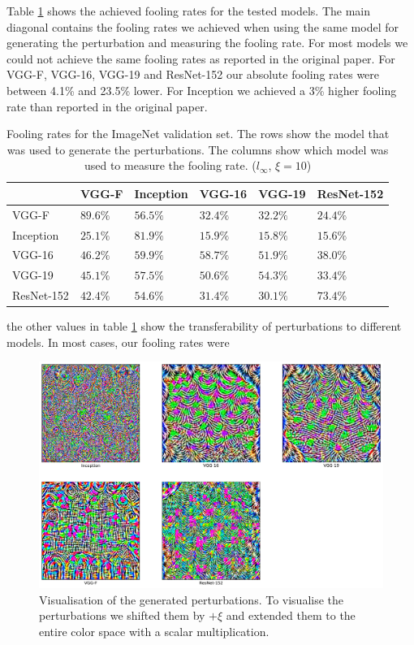 \documentclass[runningheads]{llncs}
\begin{document}
Table \ref{tbl_stoerraten_reprod_kreuz_linf} shows the achieved fooling rates for the tested models. The main diagonal contains the fooling rates we achieved when using the same model for generating the perturbation and measuring the fooling rate. For most models we could not achieve the same fooling rates as reported in the original paper. For VGG-F, VGG-16, VGG-19 and ResNet-152 our absolute fooling rates were between 4.1\% and 23.5\% lower. For Inception we achieved a 3\% higher fooling rate than reported in the original paper.

\begin{table}[]
\centering
\caption{Fooling rates for the ImageNet validation set. The rows show the model that was used to generate the perturbations. The columns show which model was used to measure the fooling rate. ($l_\infty$, $\xi=10$)}
\begin{tabular}{|l|l|l|l|l|l|}
\hline

			& VGG-F		&	Inception	&	VGG-16		&	VGG-19		&	ResNet-152	\\ \hline
VGG-F		& $89.6\%$	&	$56.5\%$		&	$32.4\%$		&	$32.2\%$		& 	$24.4\%$		\\
Inception	& $25.1\%$	&	$81.9\%$		&	$15.9\%$		&	$15.8\%$		& 	$15.6\%$	\\
VGG-16		& $46.2\%$	&	$59.9\%$		&	$58.7\%$		&	$51.9\%$		& 	$38.0\%$	\\
VGG-19		& $45.1\%$	&	$57.5\%$		&	$50.6\%$		&	$54.3\%$		& 	$33.4\%$	\\
ResNet-152	& $42.4\%$	&	$54.6\%$		&	$31.4\%$		&	$30.1\%$		& 	$73.4\%$	\\
\hline 
\end{tabular}
\label{tbl_stoerraten_reprod_kreuz_linf}
\end{table}

the other values in table \ref{tbl_stoerraten_reprod_kreuz_linf} show the transferability of perturbations to different models. In most cases, our fooling rates were
 
\begin{figure}[h]
	\centering
		\includegraphics[width=1.00\textwidth]{images/own_perturbations.png}
	\caption{Visualisation of the generated perturbations. To visualise the perturbations we shifted them by $+\xi$ and extended them to the entire color space with a scalar multiplication. }
	\label{fig_stoerwerte}
\end{figure}
\end{document}
